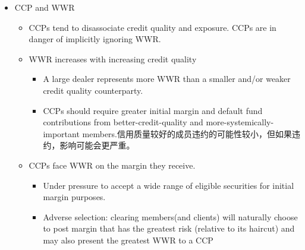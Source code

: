 \begin{itemize}
\begin{itemize}
        \begin{itemize}
            \item 敞口上升，抵质押物价值反倒下降
        \end{itemize}
        \item 例子：
        \begin{itemize}
            \item Payer interest rate swap collateralized with a high-quality government bond.（WWR:利率上升，敞口上升，抵质押物价格下降）
            \item Cross-currency swap collateralized by cash in one of the two underlying currencies. Margin is held in the currency being paid.(如：付美元利息，收日元利息，抵质押物为美元)（WWR:美元贬值，敞口上升，抵质押物价值下降）
        \end{itemize}



    \end{itemize}


    \item CCP and WWR
    \begin{itemize}
        \item CCPs tend to disassociate credit quality and exposure. CCPs are in danger of implicitly ignoring WWR.
        \item WWR increases with increasing credit quality
        \begin{itemize}
            \item A large dealer represents more WWR than a smaller and/or weaker credit quality counterparty.
            \item CCPs should require greater initial margin and default fund contributions from better-credit-quality and more-systemically-important members.信用质量较好的成员违约的可能性较小，但如果违约，影响可能会更严重。
        \end{itemize}
        \item CCPs face WWR on the margin they receive.
        \begin{itemize}
            \item Under pressure to accept a wide range of eligible securities for initial margin purposes.
            \item Adverse selection: clearing members(and clients) will naturally choose to post margin that has the greatest risk (relative to its haircut) and may also present the greatest WWR to a CCP
        \end{itemize}
    \end{itemize}


\end{itemize}










